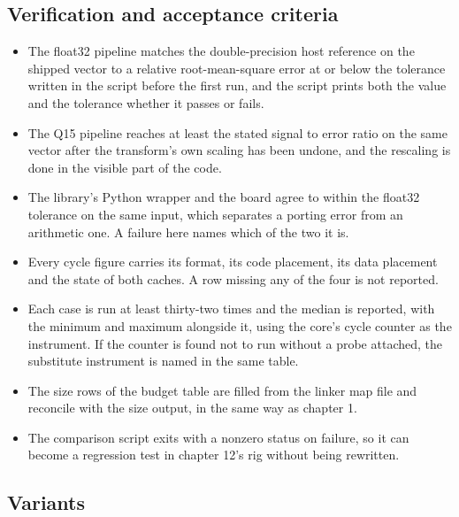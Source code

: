 \subsection*{Verification and acceptance criteria}

\begin{itemize}
\item The float32 pipeline matches the double-precision host reference on the
shipped vector to a relative root-mean-square error at or below the tolerance
written in the script before the first run, and the script prints both the
value and the tolerance whether it passes or fails.
\item The Q15 pipeline reaches at least the stated signal to error ratio on the
same vector after the transform's own scaling has been undone, and the
rescaling is done in the visible part of the code.
\item The library's Python wrapper and the board agree to within the float32
tolerance on the same input, which separates a porting error from an arithmetic
one. A failure here names which of the two it is.
\item Every cycle figure carries its format, its code placement, its data
placement and the state of both caches. A row missing any of the four is not
reported.
\item Each case is run at least thirty-two times and the median is reported,
with the minimum and maximum alongside it, using the core's cycle counter as
the instrument. If the counter is found not to run without a probe attached,
the substitute instrument is named in the same table.
\item The size rows of the budget table are filled from the linker map file and
reconcile with the size output, in the same way as chapter 1.
\item The comparison script exits with a nonzero status on failure, so it can
become a regression test in chapter 12's rig without being rewritten.
\end{itemize}

\subsection*{Variants}

